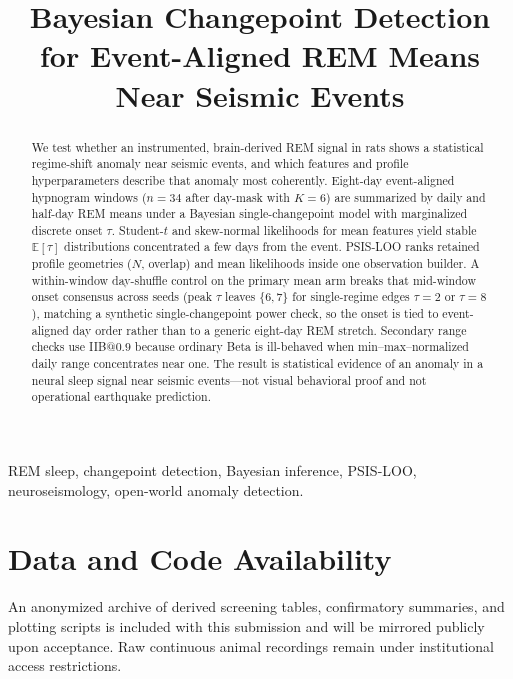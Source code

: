 \documentclass[conference]{IEEEtran}
\title{Bayesian Changepoint Detection for Event-Aligned REM Means Near Seismic Events}
\author{%
\IEEEauthorblockN{Anonymous Authors}
\IEEEauthorblockA{Affiliation withheld for triple-blind review}
}
\begin{document}
\maketitle

\begin{abstract}
We test whether an instrumented, brain-derived REM signal in rats shows a statistical regime-shift anomaly near seismic events, and which features and profile hyperparameters describe that anomaly most coherently. Eight-day event-aligned hypnogram windows (\(n=34\) after day-mask with \(K=6\)) are summarized by daily and half-day REM means under a Bayesian single-changepoint model with marginalized discrete onset \(\tau\). Student-\(t\) and skew-normal likelihoods for mean features yield stable \(\mathbb{E}[\tau]\) distributions concentrated a few days from the event. PSIS-LOO ranks retained profile geometries (\(N\), overlap) and mean likelihoods inside one observation builder. A within-window day-shuffle control on the primary mean arm breaks that mid-window onset consensus across seeds (peak \(\tau\) leaves \(\{6,7\}\) for single-regime edges \(\tau=2\) or \(\tau=8\)), matching a synthetic single-changepoint power check, so the onset is tied to event-aligned day order rather than to a generic eight-day REM stretch. Secondary range checks use IIB@\(0.9\) because ordinary Beta is ill-behaved when min–max–normalized daily range concentrates near one. The result is statistical evidence of an anomaly in a neural sleep signal near seismic events---not visual behavioral proof and not operational earthquake prediction.
\end{abstract}

\begin{IEEEkeywords}
REM sleep, changepoint detection, Bayesian inference, PSIS-LOO, neuroseismology, open-world anomaly detection.
\end{IEEEkeywords}



\section*{Data and Code Availability}
An anonymized archive of derived screening tables, confirmatory summaries, and plotting scripts is included with this submission and will be mirrored publicly upon acceptance. Raw continuous animal recordings remain under institutional access restrictions.



\end{document}
